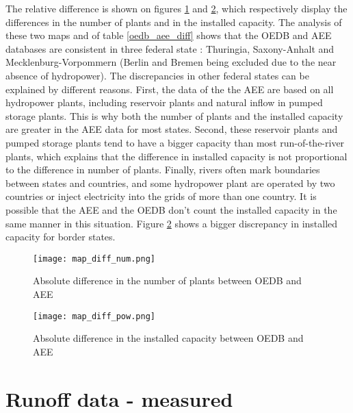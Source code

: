 The relative difference is shown on figures \ref{map_diff_num} and \ref{map_diff_pow}, which respectively display the differences in the number of plants and in the installed capacity. The analysis of these two maps and of table \ref{oedb_aee_diff} shows that the OEDB and AEE databases are consistent in three federal state : Thuringia, Saxony-Anhalt and Mecklenburg-Vorpommern (Berlin and Bremen being excluded due to the near absence of hydropower). The discrepancies in other federal states can be explained by different reasons. First, the data of the the AEE are based on all hydropower plants, including reservoir plants and natural inflow in pumped storage plants. This is why both the number of plants and the installed capacity are greater in the AEE data for most states. Second, these reservoir plants and pumped storage plants tend to have a bigger capacity than most run-of-the-river plants, which explains that the difference in installed capacity is not proportional to the difference in number of plants. Finally, rivers often mark boundaries between states and countries, and some hydropower plant are operated by two countries or inject electricity into the grids of more than one country. It is possible that the AEE and the OEDB don't count the installed capacity in the same manner in this situation. Figure \ref{map_diff_pow} shows a bigger discrepancy in installed capacity for border states.


\begin{figure}[H]
\texttt{[image: map\_diff\_num.png]}
\caption[Absolute difference in the number of plants between OEDB and AEE]{Absolute difference in the number of plants between OEDB and AEE}
\centering
\label{map_diff_num}
\end{figure}


\begin{figure}[H]
\texttt{[image: map\_diff\_pow.png]}
\caption[Absolute difference in the installed capacity between OEDB and AEE]{Absolute difference in the installed capacity between OEDB and AEE}
\centering
\label{map_diff_pow}
\end{figure}

\section{Runoff data - measured}

